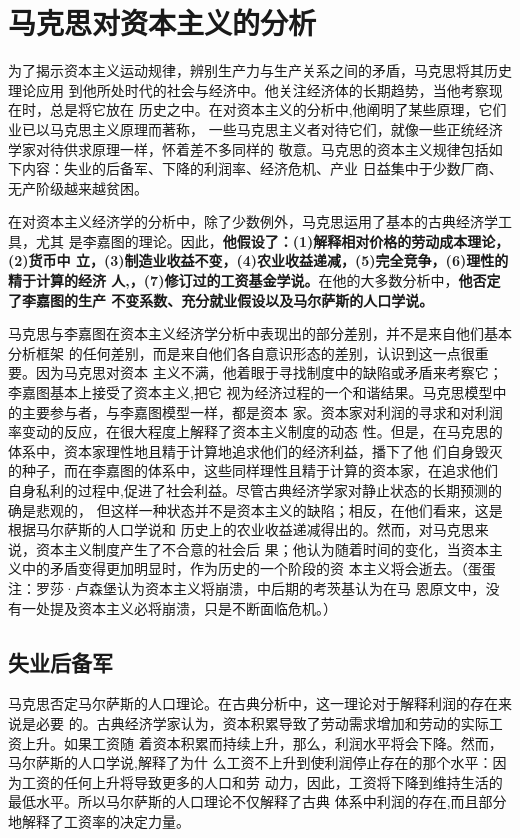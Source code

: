 \section{马克思对资本主义的分析}

为了揭示资本主义运动规律，辨别生产力与生产关系之间的矛盾，马克思将其历史理论应用
到他所处时代的社会与经济中。他关注经济体的长期趋势，当他考察现在时，总是将它放在
历史之中。在对资本主义的分析中,他阐明了某些原理，它们业已以马克思主义原理而著称，
一些马克思主义者对待它们，就像一些正统经济学家对待供求原理一样，怀着差不多同样的
敬意。马克思的资本主义规律包括如下内容：失业的后备军、下降的利润率、经济危机、产业
日益集中于少数厂商、无产阶级越来越贫困。

在对资本主义经济学的分析中，除了少数例外，马克思运用了基本的古典经济学工具，尤其
是李嘉图的理论。因此，\textbf{他假设了：(1)解释相对价格的劳动成本理论，(2)货币中
  立，(3)制造业收益不变，(4)农业收益递减，(5)完全竞争，(6)理性的精于计算的经济
  人,，(7)修订过的工资基金学说。}在他的大多数分析中，\textbf{他否定了李嘉图的生产
  不变系数、充分就业假设以及马尔萨斯的人口学说。}

马克思与李嘉图在资本主义经济学分析中表现出的部分差别，并不是来自他们基本分析框架
的任何差别，而是来自他们各自意识形态的差别，认识到这一点很重要。因为马克思对资本
主义不满，他着眼于寻找制度中的缺陷或矛盾来考察它；李嘉图基本上接受了资本主义,把它
视为经济过程的一个和谐结果。马克思模型中的主要参与者，与李嘉图模型一样，都是资本
家。资本家对利润的寻求和对利润率变动的反应，在很大程度上解释了资本主义制度的动态
性。但是，在马克思的体系中，资本家理性地且精于计算地追求他们的经济利益，播下了他
们自身毁灭的种子，而在李嘉图的体系中，这些同样理性且精于计算的资本家，在追求他们
自身私利的过程中,促进了社会利益。尽管古典经济学家对静止状态的长期预测的确是悲观的，
但这样一种状态并不是资本主义的缺陷；相反，在他们看来，这是根据马尔萨斯的人口学说和
历史上的农业收益递减得出的。然而，对马克思来说，资本主义制度产生了不合意的社会后
果；他认为随着时间的变化，当资本主义中的矛盾变得更加明显时，作为历史的一个阶段的资
本主义将会逝去。（蛋蛋注：罗莎·卢森堡认为资本主义将崩溃，中后期的考茨基认为在马
恩原文中，没有一处提及资本主义必将崩溃，只是不断面临危机。）

\subsection{失业后备军}

马克思否定马尔萨斯的人口理论。在古典分析中，这一理论对于解释利润的存在来说是必要
的。古典经济学家认为，资本积累导致了劳动需求增加和劳动的实际工资上升。如果工资随
着资本积累而持续上升，那么，利润水平将会下降。然而，马尔萨斯的人口学说,解释了为什
么工资不上升到使利润停止存在的那个水平：因为工资的任何上升将导致更多的人口和劳
动力，因此，工资将下降到维持生活的最低水平。所以马尔萨斯的人口理论不仅解释了古典
体系中利润的存在,而且部分地解释了工资率的决定力量。

